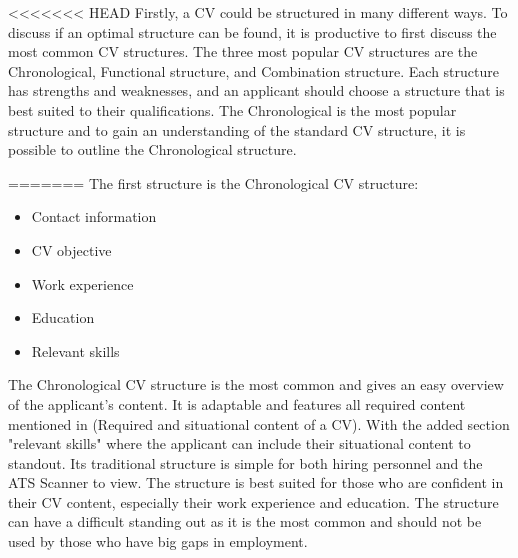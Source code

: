 <<<<<<< HEAD
Firstly, a CV could be structured in many different ways.
To discuss if an optimal structure can be found, it is productive to first discuss the most common CV structures.
The three most popular CV structures are the Chronological, Functional structure, and Combination structure. \cite{Tips_for_best_format}
Each structure has strengths and weaknesses, and an applicant should choose a structure that is best suited to their qualifications.
The Chronological is the most popular structure and to gain an understanding of the standard CV structure, it is possible to outline the Chronological structure.
\begin{enumerate}
=======
The first structure is the Chronological CV structure: \\
\begin{itemize}
>>>>>>> fa1239095d596e195a48e800ab08943e33e7641b
   \item  Contact information
   \item  CV objective
   \item  Work experience
   \item  Education
   \item  Relevant skills
   \end{itemize}
The Chronological CV structure is the most common and gives an easy overview of the applicant's content.
It is adaptable and features all required content mentioned in (Required and situational content of a CV).
With the added section "relevant skills" where the applicant can include their situational content to standout.
Its traditional structure is simple for both hiring personnel and the ATS Scanner to view.
The structure is best suited for those who are confident in their CV content, especially their work experience and education.
The structure can have a difficult standing out as it is the most common and should not be used by those who have big gaps in employment.\\
   

\end{enumerate}
